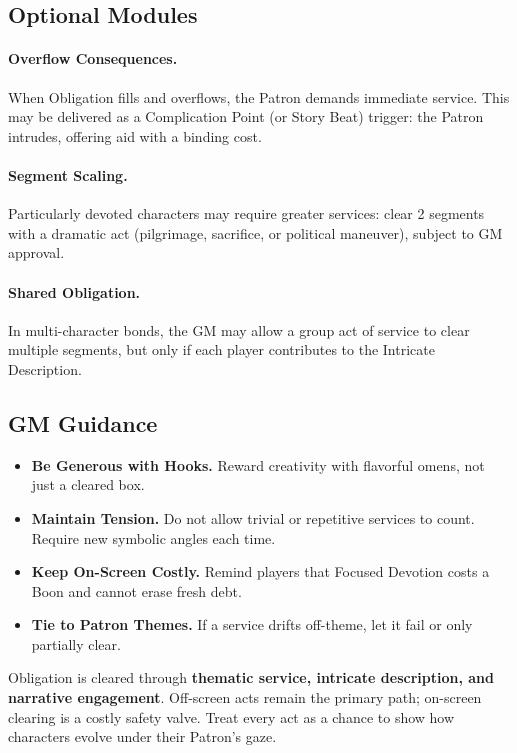 \subsection{Optional Modules}\label{subsec:obligation-modules}
\paragraph{Overflow Consequences.} When Obligation fills and overflows, the Patron demands immediate service. This may be delivered as a Complication Point (or Story Beat) trigger: the Patron intrudes, offering aid with a binding cost.
\paragraph{Segment Scaling.} Particularly devoted characters may require greater services: clear 2 segments with a dramatic act (pilgrimage, sacrifice, or political maneuver), subject to GM approval.
\paragraph{Shared Obligation.} In multi-character bonds, the GM may allow a group act of service to clear multiple segments, but only if each player contributes to the Intricate Description.

\subsection{GM Guidance}\label{subsec:obligation-gm}
\begin{itemize}
\item \textbf{Be Generous with Hooks.} Reward creativity with flavorful omens, not just a cleared box.
\item \textbf{Maintain Tension.} Do not allow trivial or repetitive services to count. Require new symbolic angles each time.
\item \textbf{Keep On-Screen Costly.} Remind players that Focused Devotion costs a Boon and cannot erase fresh debt.
\item \textbf{Tie to Patron Themes.} If a service drifts off-theme, let it fail or only partially clear.
\end{itemize}

\begin{tcolorbox}[title={Summary},colback=gray!5,colframe=black]
Obligation is cleared through \textbf{thematic service, intricate description, and narrative engagement}. Off-screen acts remain the primary path; on-screen clearing is a costly safety valve. Treat every act as a chance to show how characters evolve under their Patron’s gaze.
\end{tcolorbox}

